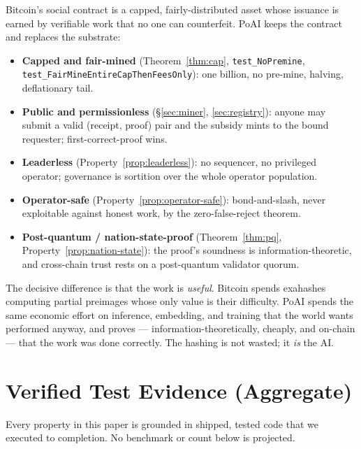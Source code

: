 \documentclass[11pt,a4paper]{article}
\begin{document}
Bitcoin's social contract is a capped, fairly-distributed asset whose issuance is earned by verifiable work that no one can counterfeit. PoAI keeps the contract and replaces the substrate:
\begin{itemize}
  \item \textbf{Capped and fair-mined} (Theorem~\ref{thm:cap}, \texttt{test\_NoPremine}, \texttt{test\_FairMineEntireCapThenFeesOnly}): one billion, no pre-mine, halving, deflationary tail.
  \item \textbf{Public and permissionless} (\S\ref{sec:miner}, \ref{sec:registry}): anyone may submit a valid (receipt, proof) pair and the subsidy mints to the bound requester; first-correct-proof wins.
  \item \textbf{Leaderless} (Property~\ref{prop:leaderless}): no sequencer, no privileged operator; governance is sortition over the whole operator population.
  \item \textbf{Operator-safe} (Property~\ref{prop:operator-safe}): bond-and-slash, never exploitable against honest work, by the zero-false-reject theorem.
  \item \textbf{Post-quantum / nation-state-proof} (Theorem~\ref{thm:pq}, Property~\ref{prop:nation-state}): the proof's soundness is information-theoretic, and cross-chain trust rests on a post-quantum validator quorum.
\end{itemize}
The decisive difference is that the work is \emph{useful}. Bitcoin spends exahashes computing partial preimages whose only value is their difficulty. PoAI spends the same economic effort on inference, embedding, and training that the world wants performed anyway, and proves --- information-theoretically, cheaply, and on-chain --- that the work was done correctly. The hashing is not wasted; it \emph{is} the AI.

\section{Verified Test Evidence (Aggregate)}\label{sec:evidence}

Every property in this paper is grounded in shipped, tested code that we executed to completion. No benchmark or count below is projected.
\end{document}
